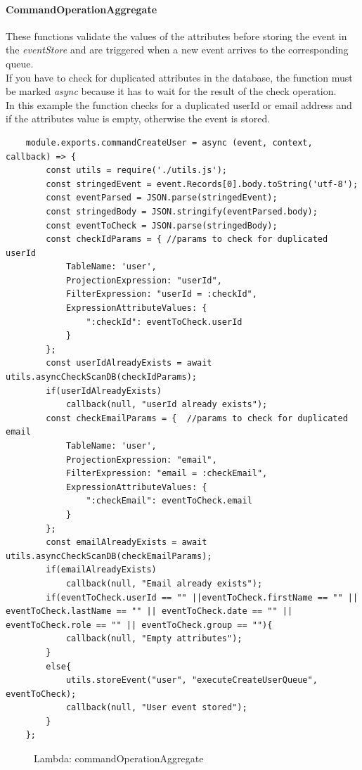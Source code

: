 \paragraph{CommandOperationAggregate} \Spazio
These functions validate the values of the attributes before storing the event in the \emph{eventStore} and are triggered when a new event arrives to the corresponding queue. \\ 
If you have to check for duplicated attributes in the database, the function must be marked \emph{async} because it has to wait for the result of the check operation.\\
In this example the function checks for a duplicated userId or email address and if the attributes value is empty, otherwise the event is stored.
\begin{lstlisting}
	module.exports.commandCreateUser = async (event, context, callback) => {
		const utils = require('./utils.js');
		const stringedEvent = event.Records[0].body.toString('utf-8'); 
		const eventParsed = JSON.parse(stringedEvent);
		const stringedBody = JSON.stringify(eventParsed.body);
		const eventToCheck = JSON.parse(stringedBody);
		const checkIdParams = { //params to check for duplicated userId
			TableName: 'user',
			ProjectionExpression: "userId",
			FilterExpression: "userId = :checkId",
			ExpressionAttributeValues: {
				":checkId": eventToCheck.userId
			}
		};
		const userIdAlreadyExists = await utils.asyncCheckScanDB(checkIdParams); 
		if(userIdAlreadyExists)
			callback(null, "userId already exists");
		const checkEmailParams = {  //params to check for duplicated email
			TableName: 'user',
			ProjectionExpression: "email",
			FilterExpression: "email = :checkEmail",
			ExpressionAttributeValues: {
				":checkEmail": eventToCheck.email
			}
		};
		const emailAlreadyExists = await utils.asyncCheckScanDB(checkEmailParams);
		if(emailAlreadyExists)
			callback(null, "Email already exists");
		if(eventToCheck.userId == "" ||eventToCheck.firstName == "" || eventToCheck.lastName == "" || eventToCheck.date == "" || eventToCheck.role == "" || eventToCheck.group == ""){ 
			callback(null, "Empty attributes");
		}
		else{
			utils.storeEvent("user", "executeCreateUserQueue", eventToCheck);
			callback(null, "User event stored");
		}
	};
\end{lstlisting}
\begin{figure}[H]
	\caption{Lambda: commandOperationAggregate}
\end{figure}

